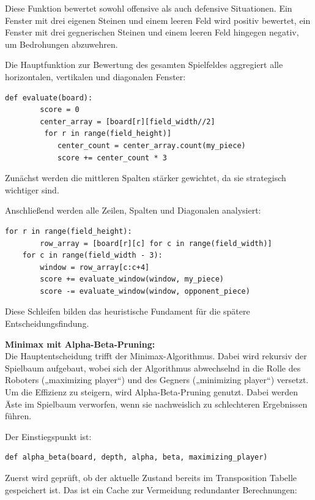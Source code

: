 Diese Funktion bewertet sowohl offensive als auch defensive Situationen. Ein Fenster mit drei eigenen Steinen und einem leeren Feld wird positiv bewertet, ein Fenster mit drei gegnerischen Steinen und einem leeren Feld hingegen negativ, um Bedrohungen abzuwehren.

Die Hauptfunktion zur Bewertung des gesamten Spielfeldes aggregiert alle horizontalen, vertikalen und diagonalen Fenster:

\begin{lstlisting}[style=pythonstyle]
	def evaluate(board):
		score = 0
		center_array = [board[r][field_width//2]
		 for r in range(field_height)]
			center_count = center_array.count(my_piece)
			score += center_count * 3
\end{lstlisting}

Zunächst werden die mittleren Spalten stärker gewichtet, da sie strategisch wichtiger sind.

Anschließend werden alle Zeilen, Spalten und Diagonalen analysiert:

\begin{lstlisting}[style=pythonstyle]
	for r in range(field_height):
		row_array = [board[r][c] for c in range(field_width)]
	for c in range(field_width - 3):
		window = row_array[c:c+4]
		score += evaluate_window(window, my_piece)
		score -= evaluate_window(window, opponent_piece)
\end{lstlisting}

Diese Schleifen bilden das heuristische Fundament für die spätere Entscheidungsfindung.

\textbf{Minimax mit Alpha-Beta-Pruning:}\\
Die Hauptentscheidung trifft der Minimax-Algorithmus. Dabei wird rekursiv der Spielbaum aufgebaut, wobei sich der Algorithmus abwechselnd in die Rolle des Roboters („maximizing player“) und des Gegners („minimizing player“) versetzt. Um die Effizienz zu steigern, wird Alpha-Beta-Pruning genutzt. Dabei werden Äste im Spielbaum verworfen, wenn sie nachweislich zu schlechteren Ergebnissen führen.

Der Einstiegspunkt ist:

\begin{lstlisting}[style=pythonstyle]
	def alpha_beta(board, depth, alpha, beta, maximizing_player)
\end{lstlisting}

Zuerst wird geprüft, ob der aktuelle Zustand bereits im Transposition Tabelle gespeichert ist. Das ist ein Cache zur Vermeidung redundanter Berechnungen:

